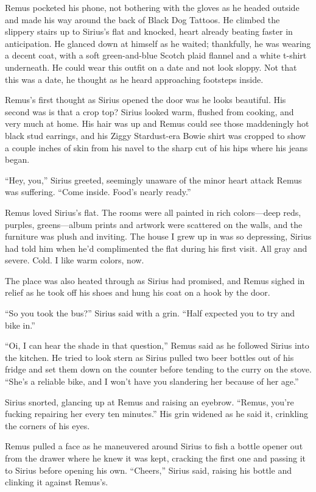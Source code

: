 Remus pocketed his phone, not bothering with the gloves as he headed outside and made his way around the back of Black Dog Tattoos. He climbed the slippery stairs up to Sirius’s flat and knocked, heart already beating faster in anticipation. He glanced down at himself as he waited; thankfully, he was wearing a decent coat, with a soft green-and-blue Scotch plaid flannel and a white t-shirt underneath. He could wear this outfit on a date and not look sloppy. Not that this was a date, he thought as he heard approaching footsteps inside.

Remus’s first thought as Sirius opened the door was he looks beautiful. His second was is that a crop top? Sirius looked warm, flushed from cooking, and very much at home. His hair was up and Remus could see those maddeningly hot black stud earrings, and his Ziggy Stardust-era Bowie shirt was cropped to show a couple inches of skin from his navel to the sharp cut of his hips where his jeans began.

“Hey, you,” Sirius greeted, seemingly unaware of the minor heart attack Remus was suffering. “Come inside. Food’s nearly ready.”

Remus loved Sirius’s flat. The rooms were all painted in rich colors—deep reds, purples, greens—album prints and artwork were scattered on the walls, and the furniture was plush and inviting. The house I grew up in was so depressing, Sirius had told him when he’d complimented the flat during his first visit. All gray and severe. Cold. I like warm colors, now.

The place was also heated through as Sirius had promised, and Remus sighed in relief as he took off his shoes and hung his coat on a hook by the door.

“So you took the bus?” Sirius said with a grin. “Half expected you to try and bike in.”

“Oi, I can hear the shade in that question,” Remus said as he followed Sirius into the kitchen. He tried to look stern as Sirius pulled two beer bottles out of his fridge and set them down on the counter before tending to the curry on the stove. “She’s a reliable bike, and I won’t have you slandering her because of her age.”

Sirius snorted, glancing up at Remus and raising an eyebrow. “Remus, you’re fucking repairing her every ten minutes.” His grin widened as he said it, crinkling the corners of his eyes.

Remus pulled a face as he maneuvered around Sirius to fish a bottle opener out from the drawer where he knew it was kept, cracking the first one and passing it to Sirius before opening his own. “Cheers,” Sirius said, raising his bottle and clinking it against Remus’s.

